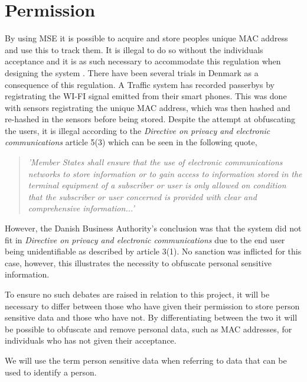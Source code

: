 \section{Permission} \label{sec:permission}
By using MSE it is possible to acquire and store peoples unique MAC address and use this to track them. It is illegal to do so without the individuals acceptance and it is as such necessary to accommodate this regulation when designing the system \cite{TrafficIlligal}.
There have been several trials in Denmark as a consequence of this regulation. A Traffic system has recorded passerbys by registrating the WI-FI signal emitted from their smart phones. This was done with sensors registrating the unique MAC address, which was then hashed and re-hashed in the sensors before being stored. Despite the attempt at obfuscating the users\cite{TrafficIlligal}, it is illegal according to the \textit{Directive on privacy and electronic communications} article 5(3)\cite{CookieDirective} which can be seen in the following quote,

\begin{quote}
\textit{'Member States shall ensure that the use of electronic communications networks to store information or to gain access to information stored in the terminal equipment of a subscriber or user is only allowed on condition that the subscriber or user concerned is provided with clear and comprehensive information...'}
\end{quote}

However, the Danish Business Authority's conclusion was that the system did not fit in \textit{Directive on privacy and electronic communications} due to the end user being unidentifiable\cite{TrafficOK} as described by article 3(1)\cite{CookieDirective}. No sanction was inflicted for this case, however, this illustrates the necessity to obfuscate personal sensitive information.

To ensure no such debates are raised in relation to this project, it will be necessary to differ between those who have given their permission to store person sensitive data and those who have not. By differentiating between the two it will be possible to obfuscate and remove personal data, such as MAC addresses, for individuals who has not given their acceptance.

We will use the term person sensitive data when referring to data that can be used to identify a person. 
